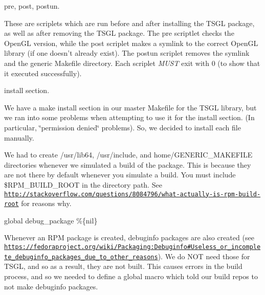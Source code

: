 \begin{DoxyItemize}
\item {\ttfamily pre}, {\ttfamily post}, {\ttfamily postun}.
\begin{DoxyItemize}
\item These are scriplets which are run before and after installing the T\-S\-G\-L package, as well as after removing the T\-S\-G\-L package. The {\ttfamily pre} scriptlet checks the Open\-G\-L version, while the {\ttfamily post} scriplet makes a symlink to the correct Open\-G\-L library (if one doesn't already exist). The {\ttfamily postun} scriplet removes the symlink and the generic Makefile directory. Each scriplet {\itshape M\-U\-S\-T} exit with 0 (to show that it executed successfully).
\end{DoxyItemize}
\item {\ttfamily install} section.
\begin{DoxyItemize}
\item We have a make install section in our master Makefile for the T\-S\-G\-L library, but we ran into some problems when attempting to use it for the install section. (In particular, \char`\"{}permission denied\char`\"{} problems). So, we decided to install each file manually.
\item We had to create {\ttfamily /usr/lib64}, {\ttfamily /usr/include}, and {\ttfamily home/\-G\-E\-N\-E\-R\-I\-C\-\_\-\-M\-A\-K\-E\-F\-I\-L\-E} directories whenever we simulated a build of the package. This is because they are not there by default whenever you simulate a build. You must include {\ttfamily \$\-R\-P\-M\-\_\-\-B\-U\-I\-L\-D\-\_\-\-R\-O\-O\-T} in the directory path. See \href{http://stackoverflow.com/questions/8084796/what-actually-is-rpm-build-root}{\tt http\-://stackoverflow.\-com/questions/8084796/what-\/actually-\/is-\/rpm-\/build-\/root} for reasons why.
\end{DoxyItemize}
\item {\ttfamily global debug\-\_\-package \%\{nil\}}
\begin{DoxyItemize}
\item Whenever an R\-P\-M package is created, debuginfo packages are also created (see \href{https://fedoraproject.org/wiki/Packaging:Debuginfo#Useless_or_incomplete_debuginfo_packages_due_to_other_reasons}{\tt https\-://fedoraproject.\-org/wiki/\-Packaging\-:\-Debuginfo\#\-Useless\-\_\-or\-\_\-incomplete\-\_\-debuginfo\-\_\-packages\-\_\-due\-\_\-to\-\_\-other\-\_\-reasons}). We do N\-O\-T need those for T\-S\-G\-L, and so as a result, they are not built. This causes errors in the build process, and so we needed to define a global macro which told our build repos to not make debuginfo packages.

\end{DoxyItemize}
\end{DoxyItemize}
